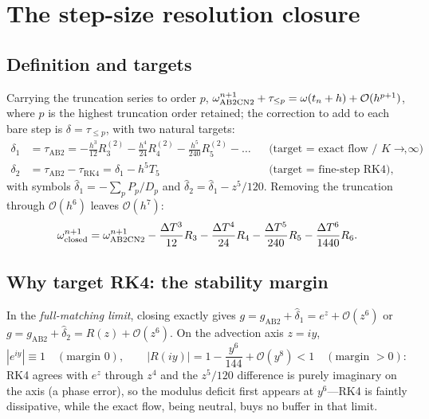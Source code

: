 \documentclass[11pt]{article}
\theoremstyle{plain}
\theoremstyle{definition}
\newcommand{\bO}{\mathcal{O}}
\newcommand{\DT}{\Delta T}
\begin{document}
\section{The step-size resolution closure}
\label{sec:closure}

\subsection{Definition and targets}
Carrying the truncation series to order $p$,
$\omega^{n+1}_{\rm AB2CN2}+\tau_{\le p}=\omega(t_n+h)+\bO(h^{p+1})$, where
$p$ is the highest truncation order retained; the correction to add to each
bare step is $\delta=\tau_{\le p}$, with two natural targets:
\begin{align}
\delta_1 &= \tau_{\mathrm{AB2}}
=-\tfrac{h^3}{12}R_3^{(2)}-\tfrac{h^4}{24}R_4^{(2)}-\tfrac{h^5}{240}R_5^{(2)}
 -\dots
&&\text{(target = exact flow / $K\!\to\!\infty$)},\\
\delta_2 &= \tau_{\mathrm{AB2}}-\tau_{\mathrm{RK4}}
=\delta_1-h^5T_5
&&\text{(target = fine-step RK4)},
\end{align}
with symbols $\hat\delta_1=-\sum_pP_p/D_p$ and
$\hat\delta_2=\hat\delta_1-z^5/120$. Removing the truncation through
$\bO(h^6)$ leaves $\bO(h^7)$:
\begin{equation}
\omega^{n+1}_{\rm closed}=\omega^{n+1}_{\rm AB2CN2}
-\frac{\DT^3}{12}R_3-\frac{\DT^4}{24}R_4-\frac{\DT^5}{240}R_5
-\frac{\DT^6}{1440}R_6 .
\label{eq:closed}
\end{equation}

\subsection{Why target RK4: the stability margin}
\label{sec:margin}
In the \emph{full-matching limit}, closing exactly gives
$g=g_{\mathrm{AB2}}+\hat\delta_1=e^z+\bO(z^6)$ or
$g=g_{\mathrm{AB2}}+\hat\delta_2=R(z)+\bO(z^6)$. On the advection axis
$z=iy$,
\begin{equation}
|e^{iy}|\equiv1\quad(\text{margin }0),\qquad
|R(iy)|=1-\frac{y^6}{144}+\bO(y^8)<1\quad(\text{margin }>0):
\label{eq:margins}
\end{equation}
RK4 agrees with $e^z$ through $z^4$ and the $z^5/120$ difference is purely
imaginary on the axis (a phase error), so the modulus deficit first appears at
$y^6$---RK4 is faintly dissipative, while the exact flow, being neutral, buys
no buffer in that limit.
\end{document}
